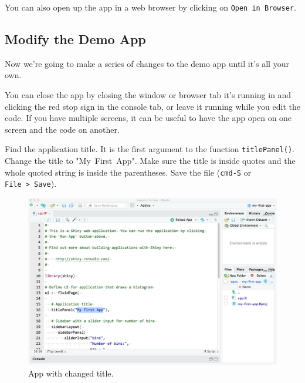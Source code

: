 \documentclass[
  oneside]{book}
\newcommand{\AttributeTok}[1]{\textcolor[rgb]{0.77,0.63,0.00}{#1}}
\newcommand{\StringTok}[1]{\textcolor[rgb]{0.31,0.60,0.02}{#1}}
\begin{document}
\begin{info}
You can also open up the app in a web browser by clicking on \texttt{Open\ in\ Browser}.

\end{info}

\hypertarget{modify-the-demo-app}{%
\subsection{Modify the Demo App}\label{modify-the-demo-app}}

Now we're going to make a series of changes to the demo app until it's all your own.

\begin{info}
You can close the app by closing the window or browser tab it's running in and clicking the red stop sign in the console tab, or leave it running while you edit the code. If you have multiple screens, it can be useful to have the app open on one screen and the code on another.

\end{info}

Find the application title. It is the first argument to the function \texttt{titlePanel}\texttt{()}. Change the \AttributeTok{title} to \StringTok{"My\ First\ App"}. Make sure the title is inside quotes and the whole quoted string is inside the parentheses. Save the file (\texttt{cmd-S} or \texttt{File\ \textgreater{}\ Save}).

\begin{figure}

{\centering \includegraphics[width=1\linewidth]{images/demo_app/06-change-title} 

}

\caption{App with changed title.}\label{fig:first-change-title}
\end{figure}
\end{document}

